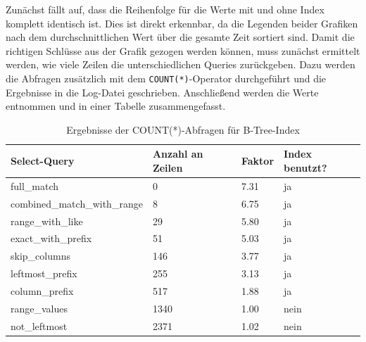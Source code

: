 Zunächst fällt auf, dass die Reihenfolge für die Werte mit und ohne Index komplett identisch ist.
Dies ist direkt erkennbar, da die Legenden beider Grafiken nach dem durchschnittlichen Wert über die gesamte Zeit sortiert sind.
Damit die richtigen Schlüsse aus der Grafik gezogen werden können, muss zunächst ermittelt werden, wie viele Zeilen die unterschiedlichen Queries zurückgeben.
Dazu werden die Abfragen zusätzlich mit dem \texttt{COUNT(*)}-Operator durchgeführt und die Ergebnisse in die Log-Datei geschrieben.
Anschließend werden die Werte entnommen und in einer Tabelle zusammengefasst.

\vspace{-5pt}
\begin{table}[H]
    \centering
    \scriptsize
    \begin{tabular}{|l|l|l|l|}
        \hline
        \textbf{Select-Query} & \textbf{Anzahl an Zeilen} & \textbf{Faktor} & \textbf{Index benutzt?} \\
        \hline
        full\_match & 0 & 7.31 & ja \\
        combined\_match\_with\_range & 8 & 6.75 & ja \\
        range\_with\_like & 29 & 5.80 & ja \\
        exact\_with\_prefix & 51 & 5.03 & ja \\
        skip\_columns & 146 & 3.77 & ja \\
        leftmost\_prefix & 255 & 3.13 & ja \\
        column\_prefix & 517 & 1.88 & ja \\
        range\_values & 1340 & 1.00 & nein \\
        not\_leftmost & 2371 & 1.02 & nein \\
        \hline
    \end{tabular}
    \vspace{3pt}
    \caption{Ergebnisse der COUNT(*)-Abfragen für B-Tree-Index}
    \label{tab:indexing_b_tree_count_results}
\end{table}
\vspace{-30pt}

